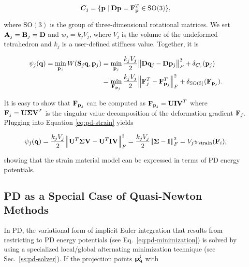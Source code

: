 \begin{equation}\label{eq:pd-strain-constraint}
    \bm{C}_j = \{ \mathbf{p} \mid \mathbf{D}\mathbf{p} = \mathbf{F}_\mathbf{p}^T \in \text{SO}(3) \},
\end{equation}

\noindent where $\text{SO}(3)$ is the group of three-dimensional rotational matrices. We set $\mathbf{A}_j = \mathbf{B}_j = \mathbf{D}$ and $w_j = k_jV_j$, 
where $V_j$ is the volume of the undeformed tetrahedron and $k_j$ is a user-defined stiffness value. Together, it is

\begin{align}
    \begin{split}\label{eq:pd-strain}    
    \psi_j(\mathbf{q}) 
    = \min_{\mathbf{p}_j} W(\mathbf{S}_j\mathbf{q}, \mathbf{p}_j) 
    &= \min_{\mathbf{p}_j} \frac{k_jV_j}{2} \norm{\mathbf{D}\mathbf{q}_j - \mathbf{D}\mathbf{p}_j}^2_F + \delta_{\bm{C}_j}(\mathbf{p}_j) \\
    &= \min_{\mathbf{F}_{\mathbf{p}_j}} \frac{k_jV_j}{2} \norm{\mathbf{F}_j^T - \mathbf{F}_{\mathbf{p}_j}^T}^2_F + \delta_{\text{SO}(3)}(\mathbf{F}_{\mathbf{p}_j}).
    \end{split}
\end{align}

\noindent It is easy to show that $\mathbf{F}_{\mathbf{p}_j}$ can be computed as $\mathbf{F}_{\mathbf{p}_j} = \mathbf{UIV}^T$ where $\mathbf{F}_j = 
\mathbf{U \Sigma V}^T$ is the singular value decomposition of the deformation gradient $\mathbf{F}_j$. Plugging into Equation \ref{eq:pd-strain}
yields

\[
    \psi_j(\mathbf{q}) = \frac{k_jV_j}{2} \norm{\mathbf{U}^T\mathbf{\Sigma}\mathbf{V} - \mathbf{U}^T\mathbf{I}\mathbf{V}}^2_F 
    = \frac{k_jV_j}{2} \norm{\mathbf{\Sigma} - \mathbf{I}}^2_F = V_j \psi_{\text{strain}}(\mathbf{F}_i),
\]

\noindent showing that the strain material model can be expressed in terms of PD energy potentials.

\subsection{PD as a Special Case of Quasi-Newton Methods}\label{ss:pd-quasi-newton}
In PD, the variational form of implicit Euler integration that results from restricting to PD energy potentials (see Eq.\ \ref{eq:pd-minimization}) 
is solved by using a specialized local/global alternating minimization technique (see Sec.\ \ref{ss:pd-solver}). If the projection points 
$\mathbf{p}^j_{\mathbf{q}}$ with 


